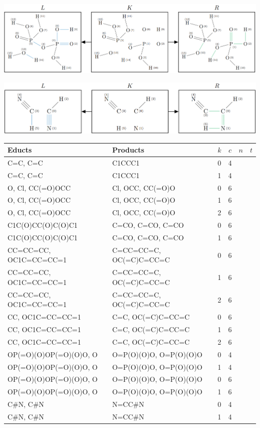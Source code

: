 \documentclass[a4paper,10pt,titlepage]{report}
\begin{document}
\includegraphics[scale=0.2]{a2_7.png}

\includegraphics[scale=0.2]{a2_8.png}


\begin{table}[!htb]
  \centering
  \begin{tabular}{ll|cccc}\\
    Educts & Products & $k$ & $c$ & $n$ & $t$\\\hline
    C=C, C=C & C1CCC1 & 0 & 4 & & \\
    C=C, C=C & C1CCC1 & 1 & 4 & & \\
    O, Cl, CC(=O)OCC & Cl, OCC, CC(=O)O & 0 & 6 \\
    O, Cl, CC(=O)OCC & Cl, OCC, CC(=O)O & 1 & 6 \\
    O, Cl, CC(=O)OCC & Cl, OCC, CC(=O)O & 2 & 6 \\
    C1C(O)CC(O)C(O)C1 & C=CO, C=CO, C=CO  & 0 & 6 & & \\
    C1C(O)CC(O)C(O)C1 & C=CO, C=CO, C=CO  & 1 & 6 & & \\
    CC=CC=CC, OC1C=CC=CC=1 & C=CC=CC=C, OC(=C)C=CC=C & 0 & 6 & & \\
    CC=CC=CC, OC1C=CC=CC=1 & C=CC=CC=C, OC(=C)C=CC=C & 1 & 6 & & \\
    CC=CC=CC, OC1C=CC=CC=1 & C=CC=CC=C, OC(=C)C=CC=C & 2 & 6 & & \\
    CC, OC1C=CC=CC=1 & C=C, OC(=C)C=CC=C & 0 & 6 & & \\
    CC, OC1C=CC=CC=1 & C=C, OC(=C)C=CC=C & 1 & 6 & & \\
    CC, OC1C=CC=CC=1 & C=C, OC(=C)C=CC=C & 2 & 6 & & \\
    OP(=O)(O)OP(=O)(O)O, O & O=P(O)(O)O, O=P(O)(O)O  & 0 & 4 & & \\
    OP(=O)(O)OP(=O)(O)O, O & O=P(O)(O)O, O=P(O)(O)O  & 1 & 4 & & \\
    OP(=O)(O)OP(=O)(O)O, O & O=P(O)(O)O, O=P(O)(O)O  & 0 & 6 & & \\
    OP(=O)(O)OP(=O)(O)O, O & O=P(O)(O)O, O=P(O)(O)O  & 1 & 6 & & \\
    C\#N, C\#N & N=CC\#N & 0 & 4 & & \\
    C\#N, C\#N & N=CC\#N & 1 & 4 & & \\
 \end{tabular}
\end{table}
\end{document}
